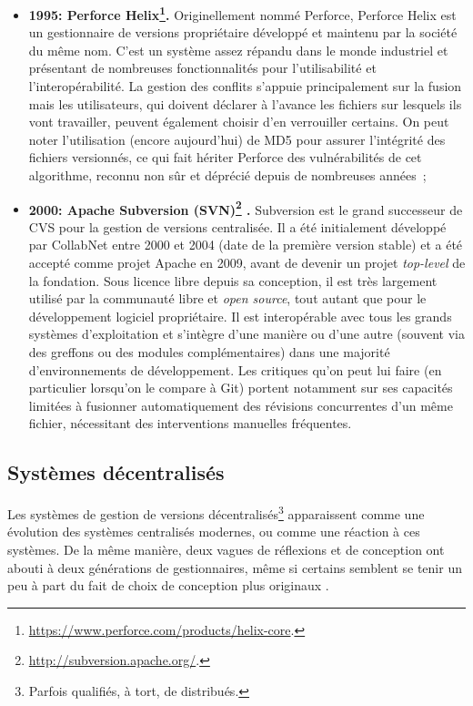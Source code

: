 \begin{itemize}
\item \textbf{1995: Perforce
    Helix\footnote{\url{https://www.perforce.com/products/helix-core}.}.} Originellement nommé Perforce, Perforce Helix est un
  gestionnaire de versions propriétaire développé et maintenu par la
  société du même nom. C'est un système assez répandu dans le monde
  industriel et présentant de nombreuses fonctionnalités pour
  l'utilisabilité et l'interopérabilité. La gestion des conflits
  s'appuie principalement sur la fusion mais les utilisateurs, qui
  doivent déclarer à l'avance les fichiers sur lesquels ils vont
  travailler, peuvent également choisir d'en verrouiller certains. On
  peut noter l'utilisation (encore aujourd'hui) de MD5 pour
  assurer l'intégrité des fichiers versionnés, ce qui fait hériter
  Perforce des vulnérabilités de cet algorithme, reconnu non sûr et
  déprécié depuis de nombreuses années~;
\item \textbf{2000: Apache Subversion
    (SVN)\footnote{\url{http://subversion.apache.org/}.}
    \cite{SVNbook}.} Subversion est le grand
  successeur de CVS pour la gestion de versions centralisée. Il a été
  initialement développé par CollabNet entre 2000 et 2004 (date de la
  première version stable) et a été accepté comme projet Apache en
  2009, avant de devenir un projet \textit{top-level} de la
  fondation. Sous licence libre depuis sa conception, il est très
  largement utilisé par la communauté libre et \textit{open source},
  tout autant que pour le développement logiciel propriétaire. Il est
  interopérable avec tous les grands systèmes d'exploitation et
  s'intègre d'une manière ou d'une autre (souvent via des greffons ou
  des modules complémentaires) dans une majorité d'environnements de
  développement. Les critiques qu'on peut lui faire (en particulier
  lorsqu'on le compare à Git) portent notamment sur ses capacités
  limitées à fusionner automatiquement des révisions concurrentes d'un
  même fichier, nécessitant des interventions manuelles fréquentes.
\end{itemize}

\subsection{Systèmes décentralisés}

Les systèmes de gestion de versions décentralisés\footnote{Parfois
  qualifiés, à tort, de \og distribués\fg.} apparaissent comme une
évolution des systèmes centralisés modernes, ou comme une réaction à
ces systèmes. De la même manière, deux vagues de réflexions et de
conception ont abouti à deux générations de gestionnaires, même si
certains semblent se tenir un peu à part du fait de choix de
conception plus originaux \cite{Baire1}.


